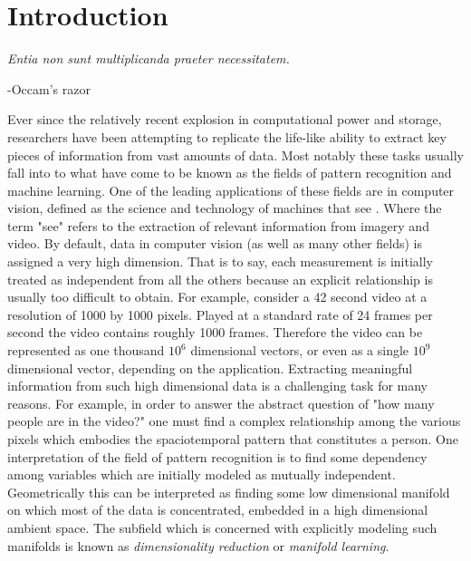 \documentclass[12pt,a4paper]{article}
\begin{document}
\section{Introduction} 
\begin{center} 
\textit{Entia non sunt multiplicanda praeter necessitatem.} \\
\begin{flushright} 
-Occam's razor 
\end{flushright}
\end{center}
Ever since the relatively recent explosion in computational power and storage, researchers have been attempting to replicate the life-like ability to extract key pieces of information from vast amounts of data. Most notably these tasks usually fall into to what have come to be known as the fields of pattern recognition and machine learning. One of the leading applications of these fields are in computer vision, defined as the science and technology of machines that see \cite{Encyclopedia Britannica}. Where the term "see" refers to the extraction of relevant information from imagery and video. By default, data in computer vision (as well as many other fields) is assigned a very high dimension. That is to say, each measurement is initially treated as independent from all the others because an explicit relationship is usually too difficult to obtain. For example, consider a 42 second video at a resolution of 1000 by 1000 pixels. Played at a standard rate of 24 frames per second the video contains roughly 1000 frames. Therefore the video can be represented as one thousand $10^6$ dimensional vectors, or even as a single $10^9$ dimensional vector, depending on the application. Extracting meaningful information from such high dimensional data is a challenging task for many reasons. For example, in order to answer the abstract question of "how many people are in the video?" one must find a complex relationship among the various pixels which embodies the spaciotemporal pattern that constitutes a person. One interpretation of the field of pattern recognition is to find some dependency among variables which are initially modeled as mutually independent. Geometrically this can be interpreted as finding some low dimensional manifold on which most of the data is concentrated, embedded in a high dimensional ambient space. The subfield which is concerned with explicitly modeling such manifolds is known as \textit{dimensionality reduction} or \textit{manifold learning}. 
\end{document}
